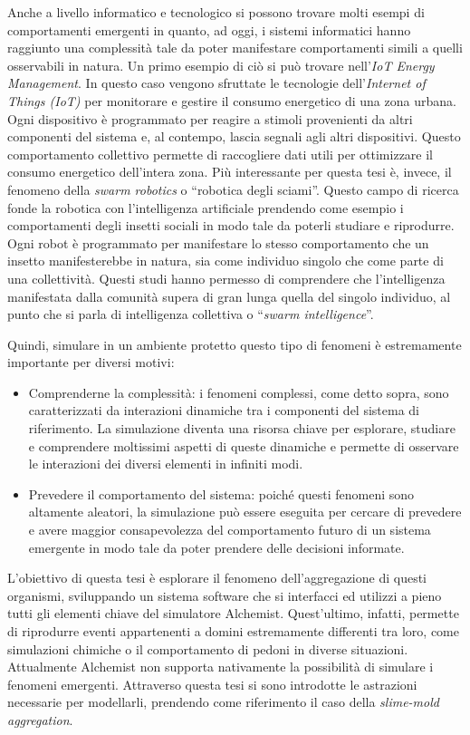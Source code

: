 Anche a livello informatico e tecnologico si possono trovare molti esempi di comportamenti emergenti in quanto, ad oggi, i sistemi informatici hanno 
raggiunto una complessità tale da poter manifestare comportamenti simili a quelli osservabili in natura.
Un primo esempio di ciò si può trovare nell'\textit{IoT Energy Management}. In questo caso vengono sfruttate le tecnologie dell'\textit{Internet of Things (IoT)}
per monitorare e gestire il consumo energetico di una zona urbana. Ogni dispositivo è programmato per reagire a stimoli provenienti da altri componenti del sistema e, al contempo,
lascia segnali agli altri dispositivi. Questo comportamento collettivo permette di raccogliere dati utili per ottimizzare il consumo energetico dell'intera zona.
Più interessante per questa tesi è, invece, il fenomeno della \textit{swarm robotics} o ``robotica degli sciami''. Questo campo di ricerca fonde la robotica con l'intelligenza artificiale 
prendendo come esempio i comportamenti degli insetti sociali in modo tale da poterli studiare e riprodurre. Ogni robot è programmato per manifestare lo stesso comportamento 
che un insetto manifesterebbe in natura, sia come individuo singolo che come parte di una collettività. Questi studi hanno permesso di comprendere che
l'intelligenza manifestata dalla comunità supera di gran lunga quella del singolo individuo, al punto che si parla di intelligenza collettiva o ``\textit{swarm intelligence}''.

Quindi, simulare in un ambiente protetto questo tipo di fenomeni è estremamente importante per diversi motivi:
\begin{itemize}
    \item Comprenderne la complessità: i fenomeni complessi, come detto sopra, sono caratterizzati da interazioni dinamiche tra
    i componenti del sistema di riferimento. La simulazione diventa una risorsa chiave per esplorare, studiare e comprendere 
    moltissimi aspetti di queste dinamiche e permette di osservare le interazioni dei diversi elementi in infiniti modi.
    \item Prevedere il comportamento del sistema: poiché questi fenomeni sono altamente aleatori, la simulazione può essere 
    eseguita per cercare di prevedere e avere maggior consapevolezza del comportamento
    futuro di un sistema emergente in modo tale da poter prendere delle decisioni informate.   
\end{itemize}

L'obiettivo di questa tesi è esplorare il fenomeno dell'aggregazione di questi organismi, sviluppando un sistema software che 
si interfacci ed utilizzi a pieno tutti gli elementi chiave del simulatore Alchemist. Quest'ultimo, infatti, permette di riprodurre eventi appartenenti 
a domini estremamente differenti tra loro, come simulazioni chimiche o il comportamento di pedoni in diverse situazioni. Attualmente Alchemist 
non supporta nativamente la possibilità di simulare i fenomeni emergenti. Attraverso questa tesi si sono introdotte
le astrazioni necessarie per modellarli, prendendo come riferimento il caso della \textit{slime-mold aggregation}.

